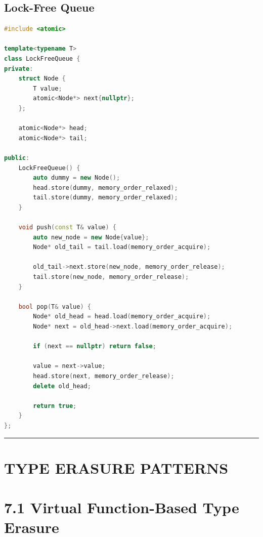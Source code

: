 \hypertarget{lock-free-queue}{%
\subsection{Lock-Free Queue}\label{lock-free-queue}}

\begin{lstlisting}[language={C++}]
#include <atomic>

template<typename T>
class LockFreeQueue {
private:
    struct Node {
        T value;
        atomic<Node*> next{nullptr};
    };
    
    atomic<Node*> head;
    atomic<Node*> tail;
    
public:
    LockFreeQueue() {
        auto dummy = new Node();
        head.store(dummy, memory_order_relaxed);
        tail.store(dummy, memory_order_relaxed);
    }
    
    void push(const T& value) {
        auto new_node = new Node{value};
        Node* old_tail = tail.load(memory_order_acquire);
        
        old_tail->next.store(new_node, memory_order_release);
        tail.store(new_node, memory_order_release);
    }
    
    bool pop(T& value) {
        Node* old_head = head.load(memory_order_acquire);
        Node* next = old_head->next.load(memory_order_acquire);
        
        if (next == nullptr) return false;
        
        value = next->value;
        head.store(next, memory_order_release);
        delete old_head;
        
        return true;
    }
};
\end{lstlisting}

\begin{center}\rule{0.5\linewidth}{0.5pt}\end{center}

\hypertarget{type-erasure-patterns}{%
\section{TYPE ERASURE PATTERNS}\label{type-erasure-patterns}}

\hypertarget{virtual-function-based-type-erasure}{%
\section{7.1 Virtual Function-Based Type
Erasure}\label{virtual-function-based-type-erasure}}


